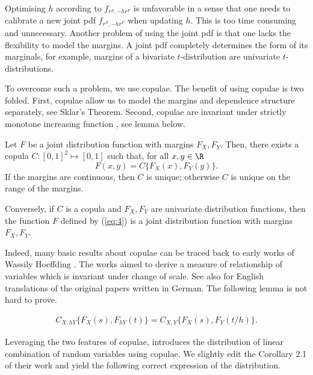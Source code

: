Optimising $h$ according to $f_{r^S,-hr^F}$ is unfavorable in a sense that one needs to calibrate a new joint pdf $f_{r^S, -hr^F}$ when updating $h$.
This is too time consuming and unnecessary.
Another problem of using the joint pdf is that one lacks the flexibility to model the margins.
A joint pdf completely determines the form of its marginals, for example, margins of a bivariate $t$-distribution are
univariate $t$-distributions.\medskip

To overcome such a problem, we use copulae.
The benefit of using copulae is two folded.
First, copulae allow us to model the margins and dependence structure separately, see Sklar's Theorem.
Second, copulae are invariant under strictly monotone increasing function \citep{schweizer1981nonparametric}, see lemma below.

\begin{theorem}
  Let $F$ be a joint distribution function with margins $F_X,
  F_Y$. Then, there exists a copula $C:[0,1]^2 \mapsto [0,1]$ such
  that, for all $x,y\in \R$
  \begin{equation}
    \label{eq:4}
    F(x,y)=C\{F_X(x), F_Y(y)\}.
  \end{equation}
  If the margins are continuous, then $C$ is unique; otherwise $C$ is
  unique on the range of the margins.

  Conversely, if $C$ is a copula and $F_X, F_Y$ are univariate
  distribution functions, then the function $F$ defined by (\ref{eq:4})
  is a joint distribution function with margins $F_X, F_Y$.
\end{theorem}

Indeed, many basic results about copulae can be traced back to early works of Wassily Hoeffding \citep{hoedffding1940, hoedffding1941}.
The works aimed to derive a measure of relationship of variables which is invariant under change of scale.
See also \citet{hoeffding2012collected} for English translations of the original papers written in German.
The following lemma is not hard to prove.

\begin{lemma}
  \begin{align}
  C_{X, hY}\{F_X(s),F_{hY}(t)\} = C_{X, Y}\{F_X(s),F_{Y}(t/h)\}.
    \end{align}
  \end{lemma}


Leveraging the two features of copulae, \citet{barbi2014copula} introduces the distribution of linear combination of random variables using copulae.
We slightly edit the Corollary 2.1 of their work and yield the following correct expression of the distribution.

